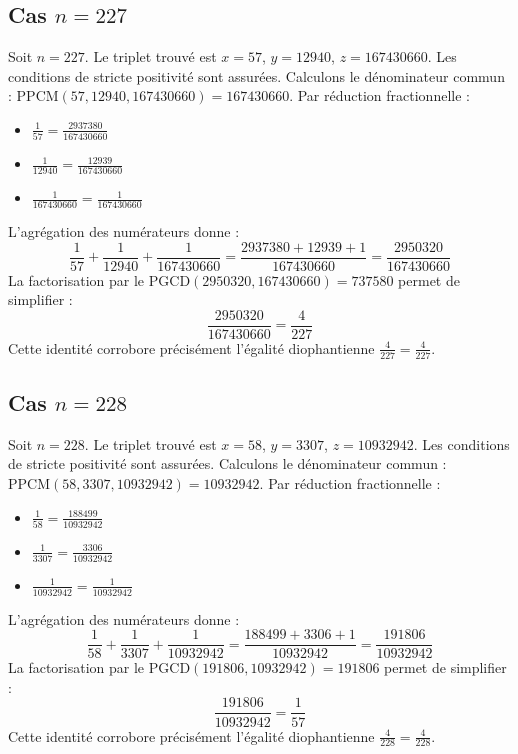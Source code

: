 \documentclass[11pt,a4paper]{article}
\begin{document}
\subsection{Cas $n = 227$}
Soit $n = 227$. Le triplet trouvé est $x = 57$, $y = 12940$, $z = 167430660$.
Les conditions de stricte positivité sont assurées.
Calculons le dénominateur commun : $\text{PPCM}(57, 12940, 167430660) = 167430660$.
Par réduction fractionnelle :
\begin{itemize}
    \item $\frac{1}{57} = \frac{2937380}{167430660}$
    \item $\frac{1}{12940} = \frac{12939}{167430660}$
    \item $\frac{1}{167430660} = \frac{1}{167430660}$
\end{itemize}
L'agrégation des numérateurs donne :
$$ \frac{1}{57} + \frac{1}{12940} + \frac{1}{167430660} = \frac{2937380 + 12939 + 1}{167430660} = \frac{2950320}{167430660} $$
La factorisation par le $\text{PGCD}(2950320, 167430660) = 737580$ permet de simplifier :
$$ \frac{2950320}{167430660} = \frac{4}{227} $$
Cette identité corrobore précisément l'égalité diophantienne $\frac{4}{227} = \frac{4}{227}$.

\subsection{Cas $n = 228$}
Soit $n = 228$. Le triplet trouvé est $x = 58$, $y = 3307$, $z = 10932942$.
Les conditions de stricte positivité sont assurées.
Calculons le dénominateur commun : $\text{PPCM}(58, 3307, 10932942) = 10932942$.
Par réduction fractionnelle :
\begin{itemize}
    \item $\frac{1}{58} = \frac{188499}{10932942}$
    \item $\frac{1}{3307} = \frac{3306}{10932942}$
    \item $\frac{1}{10932942} = \frac{1}{10932942}$
\end{itemize}
L'agrégation des numérateurs donne :
$$ \frac{1}{58} + \frac{1}{3307} + \frac{1}{10932942} = \frac{188499 + 3306 + 1}{10932942} = \frac{191806}{10932942} $$
La factorisation par le $\text{PGCD}(191806, 10932942) = 191806$ permet de simplifier :
$$ \frac{191806}{10932942} = \frac{1}{57} $$
Cette identité corrobore précisément l'égalité diophantienne $\frac{4}{228} = \frac{4}{228}$.
\end{document}
